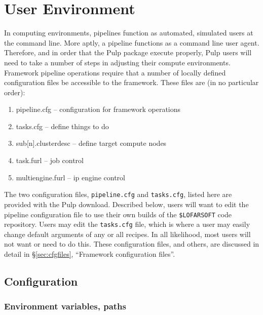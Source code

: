 \documentclass[a4paper,10pt,bibtotoc]{scrartcl}
\begin{document}
\section{User Environment}
\label{sec:environment}
In computing environments, pipelines function as automated, simulated users at the command
line.  More aptly, a pipeline functions as a command line user
agent. Therefore, and in order that the Pulp package execute properly,
Pulp users will need to take a number of steps in adjusting their
compute environments. Framework pipeline operations require that a number
of locally defined configuration files be accessible to the
framework. These files are (in no particular order):
\begin{enumerate}
\item pipeline.cfg            -- configuration for framework operations
\item tasks.cfg                -- define things to do
\item sub[n].clusterdesc -- define target compute nodes
\item task.furl                 -- job control
\item multiengine.furl     -- ip engine control
\end{enumerate}
The two configuration files, \verb|pipeline.cfg| and \verb|tasks.cfg|,
listed here are provided with the Pulp download.  Described below,
users will want to edit the pipeline configuration file to use their
own builds of the \verb|$LOFARSOFT| code repository.  Users may edit the
\verb|tasks.cfg| file, which is where a user may easily change default
arguments of any or all recipes.  In all likelihood, most users will
not want or need to do this. These configuration files, and others, are discussed in detail in
\S\ref{sec:cfgfiles}, ``Framework configuration files''.

\subsection{Configuration}
\label{sec:config}
\subsubsection{Environment variables, paths}
\end{document}
